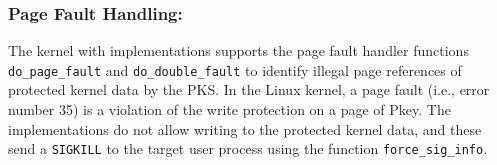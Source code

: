     
    



\subsubsection{Page Fault Handling:}

The kernel with implementations supports the page fault handler functions 
\verb|do_page_fault| and \verb|do_double_fault| to identify illegal page references 
of protected kernel data by the PKS.
In the Linux kernel, a page fault (i.e., error number 35) is a violation of the write
protection on a page of Pkey.
The implementations do not allow writing to the protected kernel data, and these
send a \verb|SIGKILL| to the target user process using the function
\verb|force_sig_info|.

